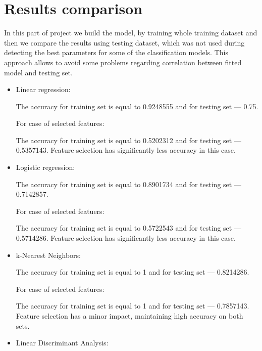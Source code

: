 \documentclass[11pt,a4paper]{article}\usepackage[]{graphicx}\usepackage[]{xcolor}
\begin{document}
	
	\section{Results comparison}\label{sec:comparison}
	In this part of project we build the model, by training whole training dataset and then we compare the results using testing dataset, which was not used during detecting the best parameters for some of the classification models. This approach allows to avoid some problems regarding correlation between fitted model and testing set.
	
	\begin{itemize}
		\item Linear regression:

		
		


The accuracy for training set is equal to 0.9248555 and for testing set --- 0.75.

For case of selected features:


		
		


The accuracy for training set is equal to 0.5202312 and for testing set --- 0.5357143.
		Feature selection has significantly less accuracy in this case.
		
		\item Logistic regression:
		

		


The accuracy for training set is equal to 0.8901734 and for testing set --- 0.7142857.

For case of selected featuers:


		


The accuracy for training set is equal to 0.5722543 and for testing set --- 0.5714286.
		Feature selection has significantly less accuracy in this case.
		\item k-Nearest Neighbors:
		


The accuracy for training set is equal to 1 and for testing set --- 0.8214286.

For case of selected features:



The accuracy for training set is equal to 1 and for testing set --- 0.7857143.
		Feature selection has a minor impact, maintaining high accuracy on both sets.
		\item Linear Discriminant Analysis:
		



\end{itemize}
\end{document}
